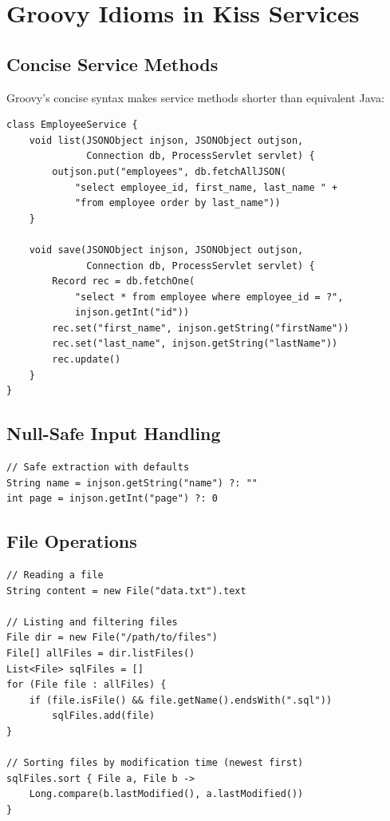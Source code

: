\section{Groovy Idioms in Kiss Services}
\label{sec:groovy-idioms}

\subsection{Concise Service Methods}

Groovy's concise syntax makes service methods shorter than equivalent Java:

\begin{lstlisting}[style=groovy]
class EmployeeService {
    void list(JSONObject injson, JSONObject outjson,
              Connection db, ProcessServlet servlet) {
        outjson.put("employees", db.fetchAllJSON(
            "select employee_id, first_name, last_name " +
            "from employee order by last_name"))
    }

    void save(JSONObject injson, JSONObject outjson,
              Connection db, ProcessServlet servlet) {
        Record rec = db.fetchOne(
            "select * from employee where employee_id = ?",
            injson.getInt("id"))
        rec.set("first_name", injson.getString("firstName"))
        rec.set("last_name", injson.getString("lastName"))
        rec.update()
    }
}
\end{lstlisting}

\subsection{Null-Safe Input Handling}

\begin{lstlisting}[style=groovy]
// Safe extraction with defaults
String name = injson.getString("name") ?: ""
int page = injson.getInt("page") ?: 0
\end{lstlisting}

\subsection{File Operations}

\begin{lstlisting}[style=groovy]
// Reading a file
String content = new File("data.txt").text

// Listing and filtering files
File dir = new File("/path/to/files")
File[] allFiles = dir.listFiles()
List<File> sqlFiles = []
for (File file : allFiles) {
    if (file.isFile() && file.getName().endsWith(".sql"))
        sqlFiles.add(file)
}

// Sorting files by modification time (newest first)
sqlFiles.sort { File a, File b ->
    Long.compare(b.lastModified(), a.lastModified())
}
\end{lstlisting}


